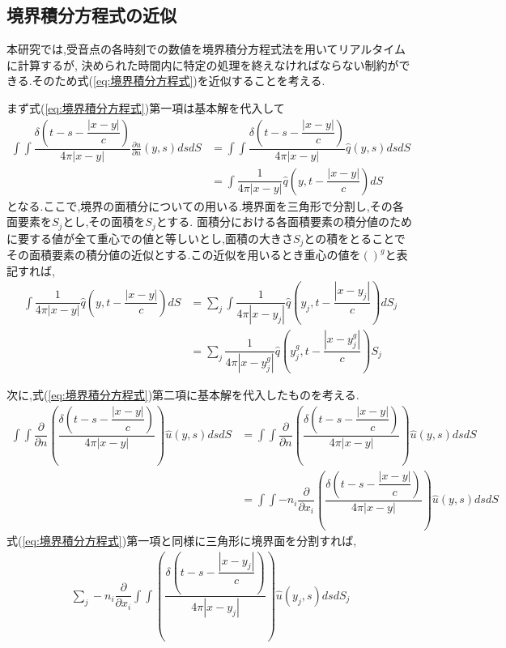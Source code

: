 \documentclass[dvipdfmx]{ampbt}
\begin{document}
\subsection{境界積分方程式の近似}
\label{kinji}
本研究では,受音点の各時刻での数値を境界積分方程式法を用いてリアルタイムに計算するが,%
決められた時間内に特定の処理を終えなければならない制約ができる.そのため式(\ref{eq:境界積分方程式})を近似することを考える.\par
まず式(\ref{eq:境界積分方程式})第一項は基本解を代入して
\begin{align}
\int\!\!\!\int \dfrac{\delta(t-s-\dfrac{|x-y|}{c})}{4\pi|x-y|} \frac{\partial u}{\partial n}(y,s)dsdS
&= \int\!\!\!\int \dfrac{\delta(t-s-\dfrac{|x-y|}{c})}{4\pi|x-y|} \hat{q}(y,s)dsdS\\
&= \int\!\!\! \dfrac{1}{4\pi|x-y|} \hat{q}(y,t-\dfrac{|x-y|}{c})dS
\end{align}
となる.ここで,境界の面積分についての用いる.境界面を三角形で分割し,その各面要素を$S_j$とし,その面積を$S_j$とする.
面積分における各面積要素の積分値のために要する値が全て重心での値と等しいとし,面積の大きさ$S_j$との積をとることで
その面積要素の積分値の近似とする.この近似を用いるとき重心の値を$( )^g$と表記すれば,
\begin{align}
\int\!\!\! \dfrac{1}{4\pi|x-y|} \hat{q}(y,t-\dfrac{|x-y|}{c})dS &= \sum_j \int\!\!\! \dfrac{1}{4\pi|x-y_j|} \hat{q}(y_j,t-\dfrac{|x-y_j|}{c})dS_j \nonumber \\
&=\sum_j \dfrac{1}{4\pi|x-y_j^g|} \hat{q}(y_j^g,t-\dfrac{|x-y_j^g|}{c})S_j
\end{align}
\par
次に,式(\ref{eq:境界積分方程式})第二項に基本解を代入したものを考える.
\begin{align}
\int\!\!\!\int \dfrac{\partial}{\partial n}\left( \dfrac{\delta(t-s-\dfrac{|x-y|}{c})}{4\pi|x-y|} \right) \hat{u}(y,s) ds dS
&= \int\!\!\!\int \dfrac{\partial}{\partial n}\left( \dfrac{\delta(t-s-\dfrac{|x-y|}{c})}{4\pi|x-y|} \right) \hat{u}(y,s) ds dS \nonumber \\
&= \int\!\!\!\int -n_i\dfrac{\partial}{\partial x_i}\left( \dfrac{\delta(t-s-\dfrac{|x-y|}{c})}{4\pi|x-y|} \right) \hat{u}(y,s) ds dS
\end{align}
式(\ref{eq:境界積分方程式})第一項と同様に三角形に境界面を分割すれば,
\begin{align}
\sum_j -n_i\dfrac{\partial}{\partial x_i}\int\!\!\!\int \left( \dfrac{\delta(t-s-\dfrac{|x-y_j|}{c})}{4\pi|x-y_j|} \right) \hat{u}(y_j,s) ds dS_j
\end{align}
\end{document}
